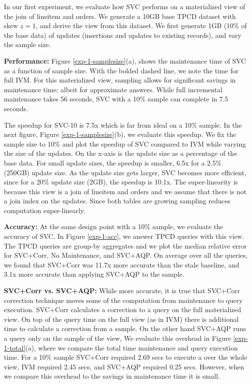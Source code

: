 In our first experiment, we evaluate how SVC performs on a materialized view of the join of \textsf{lineitem} and \textsf{orders}.
We generate a 10GB base TPCD dataset with skew $z=1$, and derive the view from this dataset.
We first generate 1GB (10\% of the base data) of updates (insertions and updates to existing records), and vary the sample size.

\textbf{Performance: }
Figure \ref{exp-1-samplesize}(a), shows the maintenance time of SVC as a function of sample size.
With the bolded dashed line, we note the time for full IVM. 
For this materialized view, sampling allows for significant savings in maintenance time; albeit for approximate answers.
While full incremental maintenance takes 56 seconds, SVC with a 10\% sample can complete in 7.5 seconds.

The speedup for SVC-10 is 7.5x which is far from ideal on a 10\% sample.
In the next figure, Figure \ref{exp-1-samplesize}(b), we evaluate this speedup. 
We fix the sample size to 10\% and plot the speedup of SVC compared to IVM while varying the size of the updates.
On the x-axis is the update size as a percentage of the base data.
For small update sizes, the speedup is smaller, 6.5x for a 2.5\% (250GB) update size.
As the update size gets larger, SVC becomes more efficient, since for a 20\% update size (2GB), the speedup is 10.1x. 
The super-linearity is because this view is a join of \textsf{lineitem} and \textsf{orders} and we assume that there is not a join index on the updates.
Since both tables are growing sampling reduces computation super-linearly. 

\textbf{Accuracy: }
At the same design point with a 10\% sample, we evaluate the accuracy of SVC.
In Figure \ref{exp-1-acc}, we answer TPCD queries with this view.
The TPCD queries are group-by aggregates and we plot the median relative error for SVC+Corr, No Maintenance, and SVC+AQP.
On average over all the queries, we found that SVC+Corr was 11.7x more accurate than the stale baseline, and 3.1x more accurate than applying SVC+AQP to the sample.

\textbf{SVC+Corr vs. SVC+AQP: }
While more accurate, it is true that SVC+Corr correction technique moves some of the computation from maintenance to query execution.
SVC+Corr calculates a correction to a query on the full materialized view.
On top of the query time on the full view (as in IVM) there is additional time to calculate a correction from a sample.
On the other hand SVC+AQP runs a query only on the sample of the view, 
We evaluate this overhead in Figure \ref{exp-1-total}(a), where we compare the total time maintenance and query execution time.
For a 10\% sample SVC+Corr required 2.69 secs to execute a \sumfunc over the whole view, IVM required 2.45 secs, and  SVC+AQP required 0.25 secs.
However, when we compare this overhead to the savings in maintenance time it is small.


